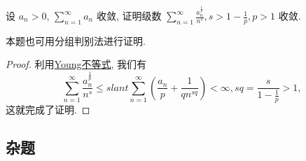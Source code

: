 \documentclass[../../main.tex]{subfiles}
\begin{document}
\begin{example}
设 $a_n > 0$, $\sum_{n=1}^{\infty} a_n$ 收敛, 证明级数 $\sum_{n=1}^{\infty} \frac{a_n^{\frac{1}{p}}}{n^s}, s > 1 - \frac{1}{p}, p > 1$ 收敛.
\end{example}
\begin{remark}
本题也可用分组判别法进行证明.
\end{remark}
\begin{proof}
利用\hyperref[theorem:Young不等式]{Young不等式}, 我们有
\[
\sum_{n=1}^{\infty} \frac{a_n^{\frac{1}{p}}}{n^s} \leqslant slant \sum_{n=1}^{\infty} \left( \frac{a_n}{p} + \frac{1}{q n^{s q}} \right) < \infty, s q = \frac{s}{1 - \frac{1}{p}} > 1,
\]
这就完成了证明.
\end{proof}



\subsection{杂题}
\end{document}
